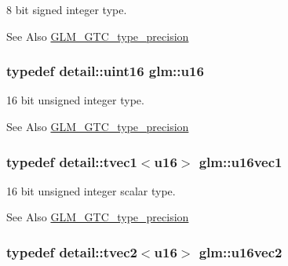 8 bit signed integer type. 

\begin{DoxySeeAlso}{See Also}
\hyperlink{group__gtc__type__precision}{G\-L\-M\-\_\-\-G\-T\-C\-\_\-type\-\_\-precision} 
\end{DoxySeeAlso}
\hypertarget{group__gtc__type__precision_gae7a1571503f83d2264ddfa705a6b082a}{
\subsubsection[{u16}]{\setlength{\rightskip}{0pt plus 5cm}typedef detail\-::uint16 {\bf glm\-::u16}}}\label{group__gtc__type__precision_gae7a1571503f83d2264ddfa705a6b082a}


16 bit unsigned integer type. 

\begin{DoxySeeAlso}{See Also}
\hyperlink{group__gtc__type__precision}{G\-L\-M\-\_\-\-G\-T\-C\-\_\-type\-\_\-precision} 
\end{DoxySeeAlso}
\hypertarget{group__gtc__type__precision_gadfda7307e98ab4ab001bf16e8af84b64}{
\subsubsection[{u16vec1}]{\setlength{\rightskip}{0pt plus 5cm}typedef detail\-::tvec1$<$u16$>$ {\bf glm\-::u16vec1}}}\label{group__gtc__type__precision_gadfda7307e98ab4ab001bf16e8af84b64}


16 bit unsigned integer scalar type. 

\begin{DoxySeeAlso}{See Also}
\hyperlink{group__gtc__type__precision}{G\-L\-M\-\_\-\-G\-T\-C\-\_\-type\-\_\-precision} 
\end{DoxySeeAlso}
\hypertarget{group__gtc__type__precision_gac4edd601deebcb0c6406814aeb28edc5}{
\subsubsection[{u16vec2}]{\setlength{\rightskip}{0pt plus 5cm}typedef detail\-::tvec2$<$u16$>$ {\bf glm\-::u16vec2}}}\label{group__gtc__type__precision_gac4edd601deebcb0c6406814aeb28edc5}


